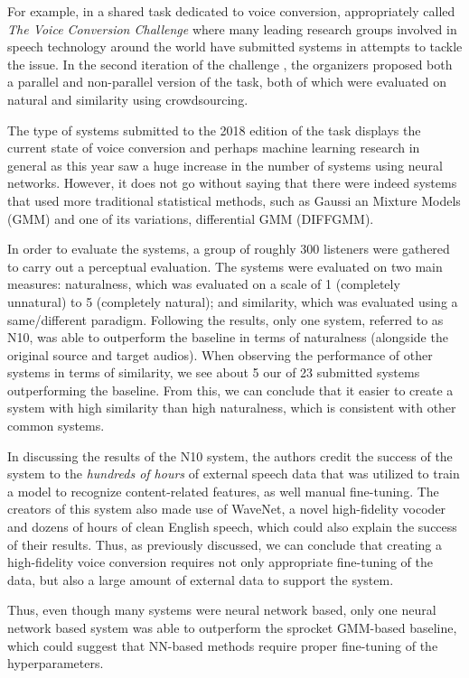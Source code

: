 \documentclass
[
    a4paper,
    twoside,
    12pt,
]
{report}
\begin{document}
For example, in a shared task dedicated to voice conversion,
appropriately called \emph{The Voice Conversion Challenge} where many
leading research groups involved in speech technology around the world
have submitted systems in attempts to tackle the issue. In the second
iteration of the challenge \textcite{lorenzo-trueba2018}, the organizers
proposed both a parallel and non-parallel version of the task, both of
which were evaluated on natural and similarity using crowdsourcing.

The type of systems submitted to the 2018 edition of the task displays
the current state of voice conversion and perhaps machine learning
research in general as this year saw a huge increase in the number of
systems using neural networks. However, it does not go without saying
that there were indeed systems that used more traditional statistical
methods, such as Gaussi an Mixture Models (GMM) and one of its
variations, differential GMM (DIFFGMM).

In order to evaluate the systems, a group of roughly 300 listeners were
gathered to carry out a perceptual evaluation. The systems were
evaluated on two main measures: naturalness, which was evaluated on a
scale of 1 (completely unnatural) to 5 (completely natural); and
similarity, which was evaluated using a same/different paradigm.
Following the results, only one system, referred to as N10, was able to
outperform the baseline in terms of naturalness (alongside the original
source and target audios). When observing the performance of other
systems in terms of similarity, we see about 5 our of 23 submitted
systems outperforming the baseline. From this, we can conclude that it
easier to create a system with high similarity than high naturalness,
which is consistent with other common systems.

In discussing the results of the N10 system, the authors credit the
success of the system to the \emph{hundreds of hours} of external speech
data that was utilized to train a model to recognize content-related
features, as well manual fine-tuning. The creators of this system also
made use of WaveNet, a novel high-fidelity vocoder and dozens of hours
of clean English speech, which could also explain the success of their
results. Thus, as previously discussed, we can conclude that creating a
high-fidelity voice conversion requires not only appropriate fine-tuning
of the data, but also a large amount of external data to support the
system.

Thus, even though many systems were neural network based, only one
neural network based system was able to outperform the sprocket
GMM-based baseline, which could suggest that NN-based methods require
proper fine-tuning of the hyperparameters.
\end{document}
